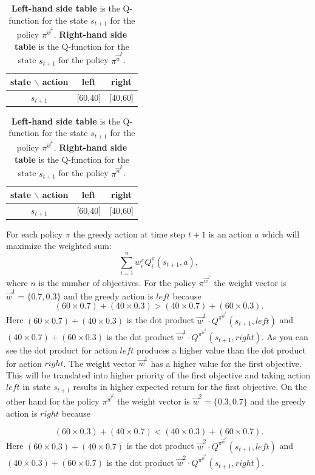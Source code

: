 {\renewcommand{\arraystretch}{1.2}
\begin{table}[!htb]
    \caption{\textbf{Left-hand side table} is the Q-function for the state $s_{t+1}$ for the policy $ \pi^{\vec{w}^{1}} $. \textbf{Right-hand side table} is the Q-function for the state $s_{t+1}$ for the policy $ \pi^{\vec{w}^{2}} $.}
    \begin{minipage}{.5\linewidth}
      \centering
        \begin{tabular}{c|c|c}
            state $\backslash$ action & left & right \\
            \hline
            $s_{t+1}$ & [60,40] & [40,60]
        \end{tabular}
    \end{minipage}%
    \begin{minipage}{.5\linewidth}
      \centering
        \begin{tabular}{c|c|c}
            state $\backslash$ action & left & right \\
            \hline
            $s_{t+1}$ & [60,40] & [40,60]
        \end{tabular}
    \end{minipage}
    \label{table:Qfunctionsfortplusone}
\end{table}

For each policy $\pi$ the greedy action at time step $t+1$ is an action $a$ which will maximize the weighted sum:
$$ \displaystyle\sum_{i=1}^{n} w^{\pi}_{i}Q^{\pi}_{i}(s_{t+1},a), $$
where $n$ is the number of objectives. For the policy $ \pi^{\vec{w}^{1}} $ the weight vector is $ \vec{w}^{1}=\{0.7,0.3\} $ and the greedy action is $ left $ because
$$ (60 \times 0.7) + (40 \times 0.3) > (40 \times 0.7) + (60 \times 0.3). $$
Here $ (60 \times 0.7) + (40 \times 0.3) $ is the dot product $ \vec{w}^{1} \cdot Q^{\pi^{\vec{w}^{1}}}(s_{t+1},left) $ and $ (40 \times 0.7) + (60 \times 0.3) $ is the dot product $ \vec{w}^{1} \cdot Q^{\pi^{\vec{w}^{1}}}(s_{t+1},right) $. As you can see the dot product for action $left$ produces a higher value than the dot product for action $right$. The weight vector $\vec{w}^{1}$ has a higher value for the first objective. This will be translated into higher priority of the first objective and taking action $left$ in state $s_{t+1}$ results in higher expected return for the first objective. On the other hand for the policy $ \pi^{\vec{w}^{2}} $ the weight vector is $ \vec{w}^{2}=\{0.3,0.7\} $ and the greedy action is $ right $ because

$$ (60 \times 0.3) + (40 \times 0.7) < (40 \times 0.3) + (60 \times 0.7). $$
Here $ (60 \times 0.3) + (40 \times 0.7) $ is the dot product $ \vec{w}^{2} \cdot Q^{\pi^{\vec{w}^{2}}}(s_{t+1},left) $ and $ (40 \times 0.3) + (60 \times 0.7) $ is the dot product $ \vec{w}^{2} \cdot Q^{\pi^{\vec{w}^{2}}}(s_{t+1},right) $.

}
